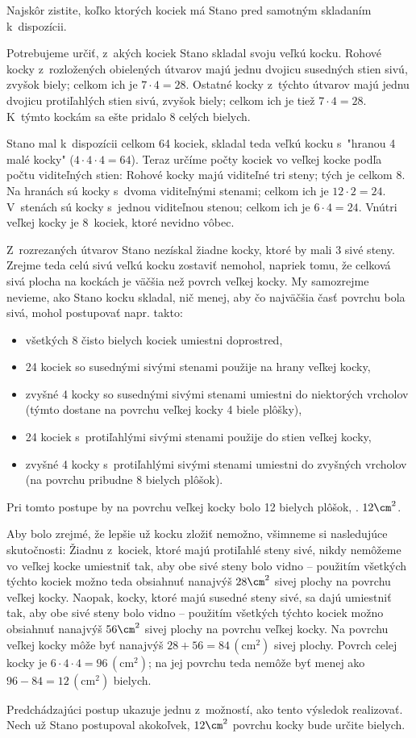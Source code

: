 {%
\napad
Najskôr zistite, koľko ktorých kociek má Stano pred samotným skladaním
k~dispozícii.

\riesenie
Potrebujeme určiť, z~akých kociek Stano skladal svoju veľkú kocku.
Rohové kocky z~rozložených obielených útvarov
majú jednu dvojicu susedných stien sivú,
zvyšok biely; celkom ich je $7\cdot4=28$.
Ostatné kocky z~týchto útvarov
majú jednu dvojicu protiľahlých stien sivú, zvyšok biely;
celkom ich je tiež $7\cdot4=28$.
K~týmto kockám sa ešte pridalo 8 celých bielych.

Stano mal k~dispozícii celkom 64 kociek, skladal teda
veľkú kocku s~"hranou 4 malé kocky" ($4\cdot4\cdot4=64$).
Teraz určíme počty kociek vo veľkej kocke podľa počtu viditeľných stien:
Rohové kocky majú viditeľné tri steny; tých je celkom 8.
Na hranách sú kocky s~dvoma viditeľnými stenami; celkom ich
je $12\cdot2=24$.
V~stenách sú kocky s~jednou viditeľnou stenou; celkom ich
je $6\cdot4=24$.
Vnútri veľkej kocky je 8~kociek, ktoré nevidno vôbec.

Z~rozrezaných útvarov Stano nezískal žiadne kocky, ktoré by mali
3 sivé steny.
Zrejme teda celú sivú veľkú kocku zostaviť nemohol, napriek tomu, že celková sivá
plocha na kockách je väčšia než povrch veľkej kocky.
My samozrejme nevieme, ako Stano kocku skladal, nič menej, aby čo najväčšia
časť povrchu bola sivá, mohol postupovať napr. takto:
\begin{itemize}
  \item všetkých 8 čisto bielych kociek umiestni doprostred,
  \item 24 kociek so susednými sivými stenami použije na hrany veľkej
    kocky,
  \item zvyšné 4 kocky so susednými sivými stenami umiestni do niektorých
    vrcholov (týmto dostane na povrchu veľkej kocky 4 biele plôšky),
  \item 24 kociek s~protiľahlými sivými stenami použije do stien veľkej
    kocky,
  \item zvyšné 4 kocky s~protiľahlými sivými stenami umiestni do zvyšných
    vrcholov (na povrchu pribudne 8 bielych plôšok).
\end{itemize}
\noindent
Pri tomto postupe by na povrchu veľkej kocky bolo 12 bielych plôšok, \tj.
$12\cm^2$.

Aby bolo zrejmé, že lepšie už kocku zložiť nemožno, všimneme si nasledujúce
skutočnosti:
Žiadnu z~kociek, ktoré majú protiľahlé steny sivé, nikdy nemôžeme vo veľkej
kocke umiestniť tak, aby obe sivé steny bolo vidno -- použitím všetkých týchto
kociek možno teda obsiahnuť nanajvýš $28\cm^2$ sivej plochy na povrchu veľkej
kocky.
Naopak, kocky, ktoré majú susedné steny sivé, sa dajú umiestniť tak, aby obe
sivé steny bolo vidno -- použitím všetkých týchto kociek možno obsiahnuť nanajvýš
$56\cm^2$ sivej plochy na povrchu veľkej kocky.
Na povrchu veľkej kocky môže byť nanajvýš $28+56=84\,(\text{cm}^2)$ sivej plochy.
Povrch celej kocky je $6\cdot4\cdot4=96\,(\text{cm}^2)$; na jej povrchu teda
nemôže byť menej ako $96-84=12\,(\text{cm}^2)$ bielych.

Predchádzajúci postup ukazuje jednu z~možností, ako tento výsledok realizovať.
Nech už Stano postupoval akokoľvek, $12\cm^2$ povrchu kocky bude určite
bielych.
}

